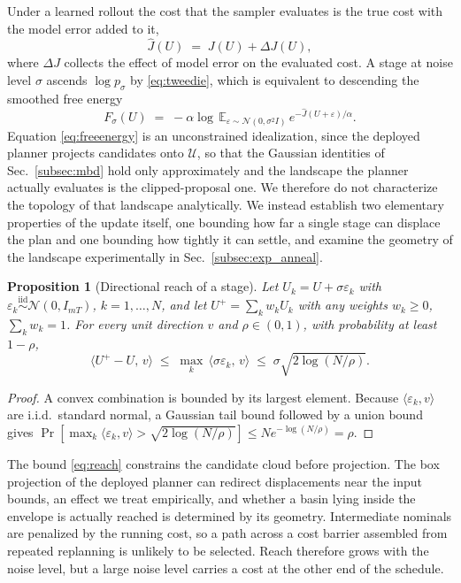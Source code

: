 \documentclass[letterpaper,10pt,conference]{ieeeconf}
\newtheorem{proposition}{Proposition}
\begin{document}
Under a learned rollout the cost that the sampler evaluates is the true cost with the model error added to it,
\begin{equation}
\hat J(U) \;=\; J(U) + \Delta J(U),
\label{eq:jhat}
\end{equation}
where $\Delta J$ collects the effect of model error on the evaluated cost.
A stage at noise level $\sigma$ ascends $\log p_\sigma$ by \eqref{eq:tweedie}, which is equivalent to descending the smoothed free energy
\begin{equation}
F_\sigma(U) \;=\; -\alpha \log\, \mathbb{E}_{\varepsilon \sim \mathcal{N}(0, \sigma^{2} I)}\,
e^{-\hat J(U + \varepsilon)/\alpha} .
\label{eq:freeenergy}
\end{equation}
Equation \eqref{eq:freeenergy} is an unconstrained idealization, since the deployed planner projects candidates onto $\mathcal{U}$, so that the Gaussian identities of Sec.~\ref{subsec:mbd} hold only approximately and the landscape the planner actually evaluates is the clipped-proposal one.
We therefore do not characterize the topology of that landscape analytically.
We instead establish two elementary properties of the update itself, one bounding how far a single stage can displace the plan and one bounding how tightly it can settle, and examine the geometry of the landscape experimentally in Sec.~\ref{subsec:exp_anneal}.

\begin{proposition}[Directional reach of a stage]\label{prop:reach}
Let $U_k = U + \sigma \varepsilon_k$ with $\varepsilon_k \overset{\mathrm{iid}}{\sim} \mathcal{N}(0, I_{mT})$, $k = 1, \dots, N$, and let $U^{+} = \sum_k w_k U_k$ with any weights $w_k \ge 0$, $\sum_k w_k = 1$.
For every unit direction $v$ and $\rho \in (0, 1)$, with probability at least $1 - \rho$,
\begin{equation}
\big\langle U^{+} - U,\, v \big\rangle
\;\le\; \max_k\, \big\langle \sigma \varepsilon_k,\, v \big\rangle
\;\le\; \sigma \sqrt{2 \log (N/\rho)} .
\label{eq:reach}
\end{equation}
\end{proposition}
\begin{proof}
A convex combination is bounded by its largest element. Because $\langle \varepsilon_k,v\rangle$ are i.i.d.\ standard normal, a Gaussian tail bound followed by a union bound gives $\Pr[\max_k \langle \varepsilon_k,v\rangle > \sqrt{2\log(N/\rho)}] \le N e^{-\log(N/\rho)}=\rho$.
\end{proof}

The bound \eqref{eq:reach} constrains the candidate cloud before projection.
The box projection of the deployed planner can redirect displacements near the input bounds, an effect we treat empirically, and whether a basin lying inside the envelope is actually reached is determined by its geometry.
Intermediate nominals are penalized by the running cost, so a path across a cost barrier assembled from repeated replanning is unlikely to be selected.
Reach therefore grows with the noise level, but a large noise level carries a cost at the other end of the schedule.
\end{document}
